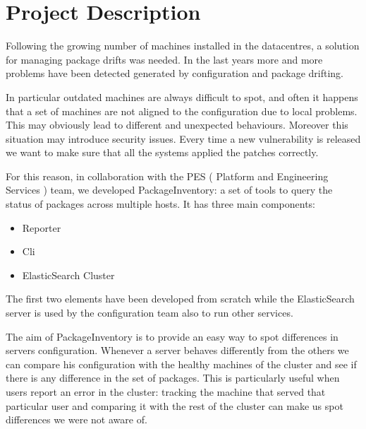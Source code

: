 \section{Project Description}

Following the growing number of machines installed in the datacentres,
a solution for managing package drifts was needed. In the last years more
and more problems have been detected generated by configuration and
package drifting.

In particular outdated machines are always difficult to spot, and often it
happens that a set of machines are not aligned to the configuration due to
local problems. This may obviously lead to different and unexpected
behaviours. Moreover this situation may introduce security issues. Every
time a new vulnerability is released we want to make sure that all the
systems applied the patches correctly.

For this reason, in collaboration with the PES ( Platform and Engineering
Services ) team, we developed PackageInventory: a set of tools to query
the status of packages across multiple hosts. It has three main
components:

\begin{itemize}
  \item Reporter
  \item Cli
  \item ElasticSearch Cluster
\end{itemize}

The first two elements have been developed from scratch while the
ElasticSearch server is used by the configuration team also to run other
services.

The aim of PackageInventory is to provide an easy way to spot differences
in servers configuration. Whenever a server behaves differently from the
others we can compare his configuration with the healthy machines of the
cluster and see if there is any difference in the set of packages. This is
particularly useful when users report an error in the cluster: tracking
the machine that served that particular user and comparing it with the
rest of the cluster can make us spot differences we were not aware of.
